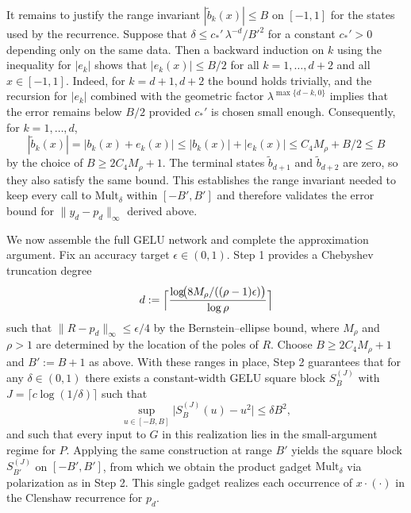 \documentclass{article}
\theoremstyle{plain}
\theoremstyle{definition}
\theoremstyle{remark}
\begin{document}
It remains to justify the range invariant $|\tilde b_k(x)|\le B$ on $[-1,1]$ for the states used by the recurrence. Suppose that \(\delta\le c_*'\,\lambda^{-d}/B'^2\) for a constant $c_*'>0$ depending only on the same data. Then a backward induction on $k$ using the inequality for $|e_k|$ shows that $|e_k(x)|\le B/2$ for all $k=1,\dots,d+2$ and all $x\in[-1,1]$. Indeed, for $k=d+1,d+2$ the bound holds trivially, and the recursion for $|e_k|$ combined with the geometric factor $\lambda^{\max\{d-k,0\}}$ implies that the error remains below $B/2$ provided $c_*'$ is chosen small enough. Consequently, for $k=1,\dots,d$,
\[
|\tilde b_k(x)|=|b_k(x)+e_k(x)|\le |b_k(x)|+|e_k(x)|\le C_4M_\rho + B/2 \le B
\]
by the choice of $B\ge 2C_4M_\rho+1$. The terminal states $\tilde b_{d+1}$ and $\tilde b_{d+2}$ are zero, so they also satisfy the same bound. This establishes the range invariant needed to keep every call to $\mathrm{Mult}_\delta$ within $[-B',B']$ and therefore validates the error bound for $\|y_d-p_d\|_\infty$ derived above.

We now assemble the full GELU network and complete the approximation argument. Fix an accuracy target $\epsilon\in(0,1)$. Step 1 provides a Chebyshev truncation degree
\[
d:=\Bigl\lceil \frac{\log\!\bigl(8M_\rho/((\rho-1)\epsilon)\bigr)}{\log\rho}\Bigr\rceil
\]
such that $\|R-p_d\|_\infty\le \epsilon/4$ by the Bernstein–ellipse bound, where $M_\rho$ and $\rho>1$ are determined by the location of the poles of $R$. Choose $B\ge 2C_4M_\rho+1$ and $B':=B+1$ as above. With these ranges in place, Step 2 guarantees that for any $\delta\in(0,1)$ there exists a constant-width GELU square block $S^{(J)}_B$ with $J=\lceil c\log(1/\delta)\rceil$ such that
\[
\sup_{u\in[-B,B]}\bigl|S_B^{(J)}(u)-u^2\bigr|\le \delta B^2,
\]
and such that every input to $G$ in this realization lies in the small-argument regime for $P$. Applying the same construction at range $B'$ yields the square block $S^{(J)}_{B'}$ on $[-B',B']$, from which we obtain the product gadget $\mathrm{Mult}_\delta$ via polarization as in Step 2. This single gadget realizes each occurrence of $x\cdot(\cdot)$ in the Clenshaw recurrence for $p_d$.
\end{document}
